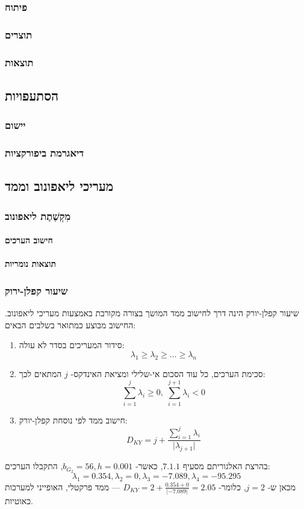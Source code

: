 \documentclass{article}
\begin{document}
\subsubsection{פיתוח}
\subsubsection{תוצרים}
\subsubsection{תוצאות}
\subsection{הסתעפויות}
\subsubsection{יישום}
\subsubsection{דיאגרמת ביפורקציות}
\subsection{מעריכי ליאפונוב וממד}
\subsubsection{מִקְשֶׁתֶת ליאפונוב}
\paragraph{חישוב הערכים}
\paragraph{תוצאות נומריות}
\subsubsection{שיעור קפלן-ירוק}
שיעור קפלן-יורק הינה דרך לחישוב ממד המושך בצורה מקורבת באמצעות מעריכי ליאפונוב. החישוב מבוצע כמתואר בשלבים הבאים:
\begin{enumerate}
    \item סידור המעריכים בסדר לא עולה: \[\lambda_1\geq\lambda_2\geq\ldots\geq\lambda_n\]
    \item סכימת הערכים, כל עוד הסכום אי-שלילי ומציאת האינדקס- \(j\) המתאים לכך: \[\sum_{i=1}^{j}\lambda_i\geq0,\;\sum_{i=1}^{j+1}\lambda_i<0\]
    \item חישוב ממד לפי נוסחת קפלן-יורק: \[D_{KY}=j+\frac{\sum\limits_{i=1}^{j}\lambda_i}{\lvert\lambda_{j+1}\rvert}\]
\end{enumerate}
בהרצת האלגוריתם מסעיף \(7.1.1\), כאשר- \(b_{G_2}=56,h=0.001\), התקבלו הערכים:
\[\lambda_1=0.354,\lambda_2=0,\lambda_3=-7.089,\lambda_4=-95.295\]
מכאן ש- \(j=2\), כלומר- \(D_{KY}=2+\frac{0.354+0}{\lvert-7.089\rvert}=2.05\) — ממד פרקטלי, האופייני למערכות כאוטיות.
\end{document}
